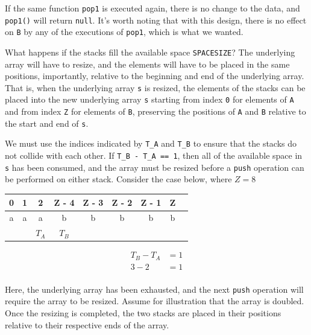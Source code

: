 \documentclass[12pt,letterpaper,final]{report}
\begin{document}
If the same function \texttt{pop1} is executed again, there is no change to the data, and \texttt{pop1()} will return \texttt{null}. It's worth noting that with this design, there is no effect on \texttt{B} by any of the executions of \texttt{pop1}, which is what we wanted.

What happens if the stacks fill the available space \texttt{SPACESIZE}? The underlying array will have to resize, and the elements will have to be placed in the same positions, importantly, relative to the beginning and end of the underlying array. That is, when the underlying array \texttt{s} is resized, the elements of the stacks can be placed into the new underlying array \texttt{s} starting from index \texttt{0} for elements of \texttt{A} and from index \texttt{Z} for elements of \texttt{B}, preserving the positions of \texttt{A} and \texttt{B} relative to the start and end of \texttt{s}.

We must use the indices indicated by \texttt{T\_A} and \texttt{T\_B} to ensure that the stacks do not collide with each other. If \texttt{T\_B - T\_A == 1}, then all of the available space in \texttt{s} has been consumed, and the array must be resized before a \texttt{push} operation can be performed on either stack. Consider the case below, where $Z = 8$

\begin{center}
  \begin{tabular}{|c|c|c|c|c|c|c|c|c|}
    \hline
    0 & 1 & 2     & Z - 4 & Z - 3 & Z - 2 & Z - 1 & Z \\ \hline
    a & a & a     & b     & b     & b     & b     & b \\ \hline
      &   & $T_A$ & $T_B$ &       &       &       &   \\ \hline
  \end{tabular}
\end{center}

\begin{align*}
  T_B - T_A & = 1 \\
  3 - 2     & = 1 \\
\end{align*}

Here, the underlying array has been exhausted, and the next \texttt{push} operation will require the array to be resized. Assume for illustration that the array is doubled. Once the resizing is completed, the two stacks are placed in their positions relative to their respective ends of the array.
\end{document}
